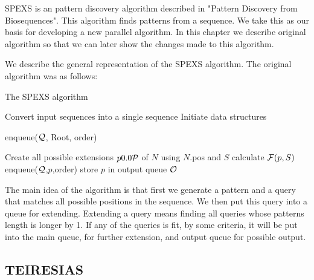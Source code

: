 SPEXS is an pattern discovery algorithm described in "Pattern Discovery from Biosequences"\cite{spexs}. This algorithm finds patterns from a sequence. We take this as our basis for developing a new parallel algorithm. In this chapter we describe original algorithm so that we can later show the changes made to this algorithm.

We describe the general representation of the SPEXS algorithm. 
The original algorithm was as follows:


\begin{algorithm}[H]
	\caption{The SPEXS algorithm}
\begin{algorithmic}[1]

	\State Convert input sequences into a single sequence
	\State Initiate data structures

	\State enqueue($\mathcal{Q}$, Root, order)

		\State Create all possible extensions $p \in \sym{P}$ of $N$ using $N$.pos and $S$
				\State calculate $\mathcal{F}(p,S)$
				\State enqueue($\mathcal{Q}$,$p$,order)
					\State store $p$ in output queue $\mathcal{O}$
				\EndIf
			\EndIf
		\EndFor
	\EndWhile
\end{algorithmic}
\end{algorithm}

The main idea of the algorithm is that first we generate a 
pattern and a query that matches all possible positions in 
the sequence. We then put this query into a queue for extending.
Extending a query means finding all queries whose patterns length
is longer by 1. If any of the queries is fit, by some criteria,
it will be put into the main queue, for further extension, 
and output queue for possible output.

\subsection{TEIRESIAS}

